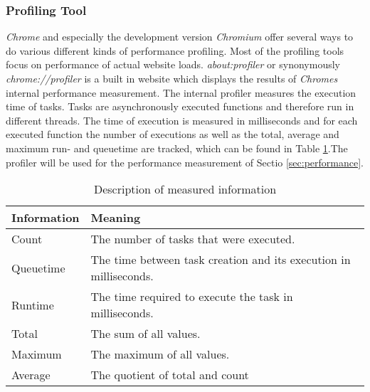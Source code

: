 \subsubsection{Profiling Tool}
\label{sec:profiler}
\emph{Chrome} and especially the development version \emph{Chromium} offer several ways to do various different kinds of performance profiling. Most of the profiling tools focus on performance of actual website loads. \emph{about:profiler} or synonymously \emph{chrome://profiler} is a built in website which displays the results of \emph{Chromes} internal performance measurement. The internal profiler measures the execution time of tasks. Tasks are asynchronously executed functions and therefore run in different threads. The time of execution is measured in milliseconds and for each executed function the number of executions as well as the total, average and maximum run- and queuetime are tracked, which can be found in Table \ref{fig:ex1_info}.The profiler will be used for the performance measurement of Sectio \ref{sec:performance}.
\begin{table}
\begin{tabularx}{\textwidth}{|l|X|}
\hline
Information & Meaning \\ \hline
Count & The number of tasks that were executed. \\ \hline
Queuetime & The time between task creation and its execution in milliseconds. \\ \hline
Runtime & The time required to execute the task in milliseconds. \\ \hline
Total & The sum of all values. \\ \hline
Maximum & The maximum of all values. \\ \hline
Average & The quotient of total and count \\ \hline
\end{tabularx}
\caption{Description of measured information}
\label{fig:ex1_info}
\end{table}